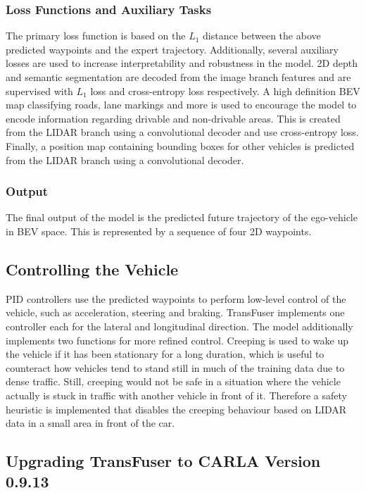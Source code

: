 \subsubsection{Loss Functions and Auxiliary Tasks}
The primary loss function is based on the $L_1$ distance between the above predicted waypoints and the expert trajectory. Additionally, several auxiliary losses are used to increase interpretability and robustness in the model. 2D depth and semantic segmentation are decoded from the image branch features and are supervised with $L_1$ loss and cross-entropy loss respectively. A high definition BEV map classifying roads, lane markings and more is used to encourage the model to encode information regarding drivable and non-drivable areas. This is created from the LIDAR branch using a convolutional decoder and use cross-entropy loss. Finally, a position map containing bounding boxes for other vehicles is predicted from the LIDAR branch using a convolutional decoder.

\subsubsection{Output}
The final output of the model is the predicted future trajectory of the ego-vehicle in BEV space. This is represented by a sequence of four 2D waypoints.


\subsection{Controlling the Vehicle}
PID controllers use the predicted waypoints to perform low-level control of the vehicle, such as acceleration, steering and braking. TransFuser implements one controller each for the lateral and longitudinal direction. The model additionally implements two functions for more refined control. Creeping is used to wake up the vehicle if it has been stationary for a long duration, which is useful to counteract how vehicles tend to stand still in much of the training data due to dense traffic. Still, creeping would not be safe in a situation where the vehicle actually is stuck in traffic with another vehicle in front of it. Therefore a safety heuristic is implemented that disables the creeping behaviour based on LIDAR data in a small area in front of the car. 


\subsection{Upgrading TransFuser to CARLA Version 0.9.13}

